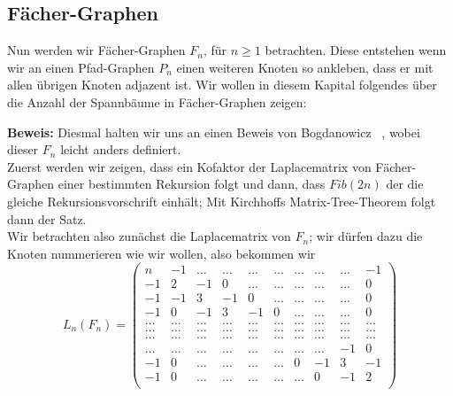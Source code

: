 \subsection{Fächer-Graphen}
Nun werden wir Fächer-Graphen $F_n$, für $n \geq 1$ betrachten. Diese entstehen wenn wir an einen Pfad-Graphen $P_{n}$ einen weiteren Knoten so ankleben, dass er mit allen übrigen Knoten adjazent ist. 
Wir wollen in diesem Kapital folgendes über die Anzahl der Spannbäume in Fächer-Graphen zeigen:
\begin{Tms}
 \label{ThmFn}
\end{Tms}
\textbf{Beweis:}
Diesmal halten wir uns an einen Beweis von Bogdanowicz ~\cite{bogdanowicz_2008}, wobei dieser $F_n$ leicht anders definiert.\\
Zuerst werden wir zeigen, dass ein Kofaktor der Laplacematrix von Fächer-Graphen einer bestimmten Rekursion folgt und dann, dass $Fib(2n)$ der die gleiche Rekursionsvorschrift einhält; Mit Kirchhoffs Matrix-Tree-Theorem folgt dann der Satz.\\
Wir betrachten also zunächst die Laplacematrix von $F_n$; wir dürfen dazu die Knoten nummerieren wie wir wollen, also bekommen wir\\
\begin{equation}
L_n(F_n)=
\begin{pmatrix}
n&-1&\ldots&\ldots&\ldots&\ldots&\ldots&\ldots&\ldots&-1\\
-1&2&-1&0&\ldots&\ldots&\ldots&\ldots&\ldots&0\\
-1&-1&3&-1&0&\ldots&\ldots&\ldots&\ldots&0\\
-1&0&-1&3&-1&0&\ldots&\ldots&\ldots&0\\
\ldots&\ldots&\ldots&\ldots&\ldots&\ldots&\ldots&\ldots&\ldots&\ldots\\
\ldots&\ldots&\ldots&\ldots&\ldots&\ldots&\ldots&\ldots&\ldots&\ldots\\
\ldots&\ldots&\ldots&\ldots&\ldots&\ldots&\ldots&\ldots&\ldots&\ldots\\
\ldots&\ldots&\ldots&\ldots&\ldots&\ldots&\ldots&\ldots&-1&0\\
-1&0&\ldots&\ldots&\ldots&\ldots&0&-1&3&-1\\
-1&0&\ldots&\ldots&\ldots&\ldots&\ldots&0&-1&2\\
\end{pmatrix}
\end{equation}
